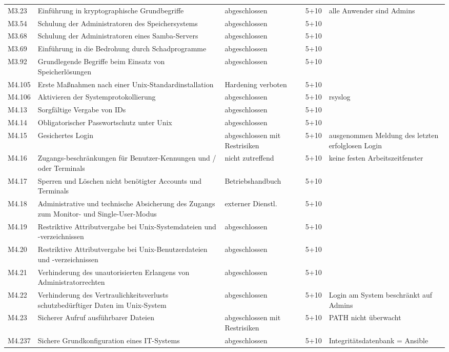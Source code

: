 \begin{longtable}{lp{3.7cm}p{3cm}lp{3.8cm}}
M3.23 & Einführung in kryptographische Grundbegriffe & abgeschlossen & 5+10 & alle Anwender sind Admins \\
M3.54 & Schulung der Administratoren des Speichersystems & abgeschlossen & 5+10 &  \\
M3.68 & Schulung der Administratoren eines Samba-Servers & abgeschlossen & 5+10 &  \\
M3.69 & Einführung in die Bedrohung durch Schadprogramme & abgeschlossen & 5+10 &  \\
M3.92 & Grundlegende Begriffe beim Einsatz von Speicherlösungen & abgeschlossen & 5+10 &  \\
M4.105 & Erste Maßnahmen nach einer Unix-Standardinstallation & Hardening verboten & 5+10 &  \\
M4.106 & Aktivieren der Systemprotokollierung & abgeschlossen & 5+10 & rsyslog \\
M4.13 & Sorgfältige Vergabe von IDs & abgeschlossen & 5+10 &  \\
M4.14 & Obligatorischer Passwortschutz unter Unix & abgeschlossen & 5+10 &  \\
M4.15 & Gesichertes Login & abgeschlossen mit Restrisiken & 5+10 & ausgenommen Meldung des letzten erfolglosen Login \\
M4.16 & Zugangs-beschränkungen für Benutzer-Kennungen und / oder Terminals & nicht zutreffend & 5+10 & keine festen Arbeitszeitfenster \\
M4.17 & Sperren und Löschen nicht benötigter Accounts und Terminals & Betriebshandbuch & 5+10 &  \\
M4.18 & Administrative und technische Absicherung des Zugangs zum Monitor- und Single-User-Modus & externer Dienstl. & 5+10 &  \\
M4.19 & Restriktive Attributvergabe bei Unix-Systemdateien und -verzeichnissen & abgeschlossen & 5+10 &  \\
M4.20 & Restriktive Attributvergabe bei Unix-Benutzerdateien und -verzeichnissen & abgeschlossen & 5+10 &  \\
M4.21 & Verhinderung des unautorisierten Erlangens von Administratorrechten & abgeschlossen & 5+10 &  \\
M4.22 & Verhinderung des Vertraulichkeitsverlusts schutzbedürftiger Daten im Unix-System & abgeschlossen & 5+10 & Login am System beschränkt auf Admins \\
M4.23 & Sicherer Aufruf ausführbarer Dateien & abgeschlossen mit Restrisiken & 5+10 & PATH nicht überwacht \\
M4.237 & Sichere Grundkonfiguration eines IT-Systems & abgeschlossen & 5+10 & Integritätsdatenbank = Ansible \\

\end{longtable}
